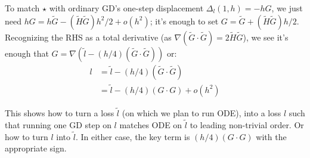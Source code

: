 \documentclass[12pt]{article}
\newcommand{\cit}[1]{[\textbf{#1}]}
\newcommand{\moosect}[1]{\par\noindent\hspace{-1cm}\textsc{\textbf{#1}}.}
\begin{document}
    To match $\star$ with ordinary GD's one-step displacement $\Delta_l(1,h)
    = -hG$, we just need $hG = h\tilde{G} - (\tilde H \tilde G) h^2/2 + o(h^2)$;
    it's enough to set $G=\tilde{G}+(\tilde H \tilde G) h/2$.  Recognizing
    the RHS as a total derivative (as $\nabla(\tilde G\cdot \tilde
    G) = 2\tilde{H}\tilde{G}$), we see it's enough that $G = \nabla(\tilde l - (h/4) (\tilde G\cdot \tilde G))$ or:
    \begin{align*}
        l &= \tilde l - (h/4) (\tilde G\cdot \tilde G) \\
          &= \tilde l - (h/4) (G\cdot G) + o(h^2)
    \end{align*}

    This shows how to turn a loss $\tilde l$ (on which we plan to run ODE),
    into a loss $l$ such that running one GD step on $l$ matches ODE on $\tilde
    l$ to leading non-trivial order.  Or how to turn
    $l$ into $\tilde l$.  In either case, the key term is $(h/4) (G\cdot G)$ with
    the appropriate sign.


\end{document}
